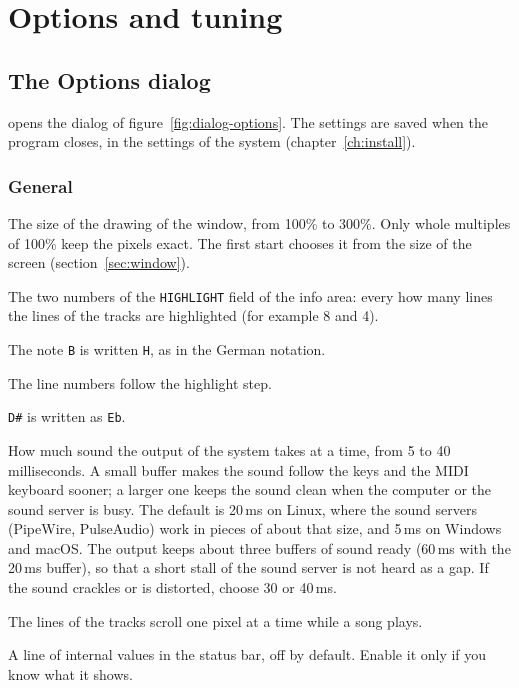 \chapter{Options and tuning}\label{ch:options}

\section{The Options dialog}\label{sec:options}

 opens the dialog of figure~\ref{fig:dialog-options}. The settings are saved when the
program closes, in the settings of the system (chapter~\ref{ch:install}).


\subsection{General}

\begin{description}[style=nextline,leftmargin=1.2cm]
  \item[Interface size (in \%)] The size of the drawing of the window, from 100\% to 300\%. Only whole multiples of 100\% keep
        the pixels exact. The first start chooses it from the size of the screen (section~\ref{sec:window}).
  \item[Track line highlight step] The two numbers of the \texttt{HIGHLIGHT} field of the info area: every how many lines the lines of
        the tracks are highlighted (for example 8 and 4).
  \item[Use German notation] The note \texttt{B} is written \texttt{H}, as in the German notation.
  \item[Alternative track line numbering] The line numbers follow the highlight step.
  \item[Display accidentals as flats instead of sharps] \texttt{D\#} is written as \texttt{Eb}.
  \item[Audio buffer] How much sound the output of the system takes at a time, from 5 to 40 milliseconds. A small buffer
        makes the sound follow the keys and the MIDI keyboard sooner; a larger one keeps the sound clean when the computer or
        the sound server is busy. The default is 20\,ms on Linux, where the sound servers (PipeWire, PulseAudio) work in
        pieces of about that size, and 5\,ms on Windows and macOS. The output keeps about three buffers of sound ready (60\,ms
        with the 20\,ms buffer), so that a short stall of the sound server is not heard as a gap. If the sound crackles or is
        distorted, choose 30 or 40\,ms.
  \item[Smooth scroll during playback] The lines of the tracks scroll one pixel at a time while a song plays.
  \item[Debug display] A line of internal values in the status bar, off by default. Enable it only if you know what it shows.
\end{description}

